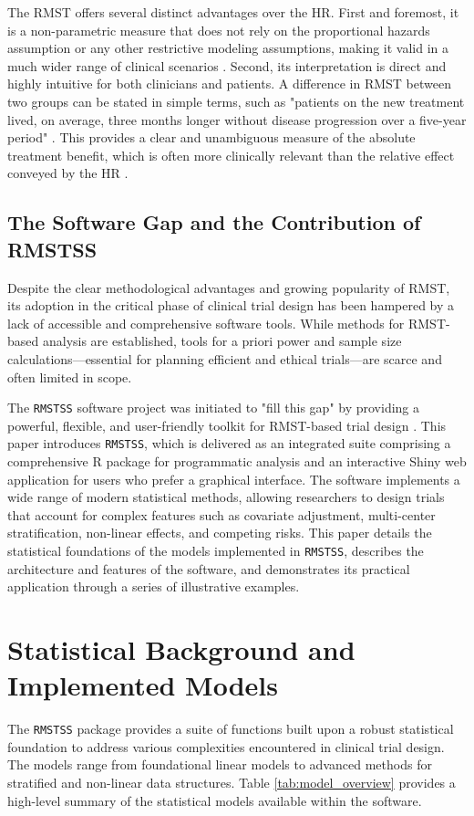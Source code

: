 \documentclass[11pt, a4paper]{article}
\begin{document}
The RMST offers several distinct advantages over the HR. First and foremost, it is a non-parametric measure that does not rely on the proportional hazards assumption or any other restrictive modeling assumptions, making it valid in a much wider range of clinical scenarios \cite{[1]}. Second, its interpretation is direct and highly intuitive for both clinicians and patients. A difference in RMST between two groups can be stated in simple terms, such as "patients on the new treatment lived, on average, three months longer without disease progression over a five-year period" \cite{[1]}. This provides a clear and unambiguous measure of the absolute treatment benefit, which is often more clinically relevant than the relative effect conveyed by the HR \cite{[1]}.

\subsection{The Software Gap and the Contribution of RMSTSS}
Despite the clear methodological advantages and growing popularity of RMST, its adoption in the critical phase of clinical trial design has been hampered by a lack of accessible and comprehensive software tools. While methods for RMST-based analysis are established, tools for a priori power and sample size calculations—essential for planning efficient and ethical trials—are scarce and often limited in scope.

The \texttt{RMSTSS} software project was initiated to "fill this gap" by providing a powerful, flexible, and user-friendly toolkit for RMST-based trial design \cite{[1]}. This paper introduces \texttt{RMSTSS}, which is delivered as an integrated suite comprising a comprehensive R package for programmatic analysis and an interactive Shiny web application for users who prefer a graphical interface. The software implements a wide range of modern statistical methods, allowing researchers to design trials that account for complex features such as covariate adjustment, multi-center stratification, non-linear effects, and competing risks. This paper details the statistical foundations of the models implemented in \texttt{RMSTSS}, describes the architecture and features of the software, and demonstrates its practical application through a series of illustrative examples.

\section{Statistical Background and Implemented Models}
The \texttt{RMSTSS} package provides a suite of functions built upon a robust statistical foundation to address various complexities encountered in clinical trial design. The models range from foundational linear models to advanced methods for stratified and non-linear data structures. Table \ref{tab:model_overview} provides a high-level summary of the statistical models available within the software.
\end{document}
